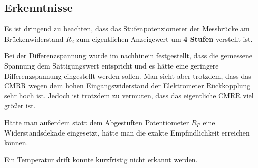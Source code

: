 \subsection{Erkenntnisse}

\begin{highlightblock}
Es ist dringend zu beachten, dass das Stufenpotenziometer der Messbrücke am Brückenwiderstand $R_2$ zum eigentlichen Anzeigewert um \textbf{4 Stufen} verstellt ist.
\end{highlightblock}

Bei der Differenzspannung wurde im nachhinein festgestellt, dass die gemessene Spannung dem Sättigungswert entspricht und es hätte eine geringere Differenzspannung eingestellt werden sollen. Man sieht aber trotzdem, dass das CMRR wegen dem hohen Eingangswiderstand der Elektrometer Rückkopplung sehr hoch ist. Jedoch ist trotzdem zu vermuten, dass das eigentliche CMRR viel größer ist.

Hätte man außerdem statt dem Abgestuften Potentiometer $R_P$ eine Widerstandsdekade eingesetzt, hätte man die exakte Empfindlichkeit erreichen können.

Ein Temperatur drift konnte kurzfristig nicht erkannt werden.